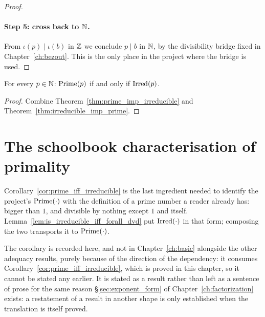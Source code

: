 \begin{proof}
  \paragraph{Step 5: cross back to $\mathbb{N}$.}
  From $\iota(p) \mid \iota(b)$ in $\mathbb{Z}$ we conclude $p \mid b$ in $\mathbb{N}$, by the
  divisibility bridge fixed in Chapter~\ref{ch:bezout}. This is the only place in
  the project where the bridge is used.
\end{proof}

\begin{corollary}
  \leanok
  \label{cor:prime_iff_irreducible}
  For every $p \in \mathbb{N}$: $\mathrm{Prime}(p)$ if and only if $\mathrm{Irred}(p)$.
\end{corollary}
\begin{proof}
  \leanok
  Combine Theorem~\ref{thm:prime_imp_irreducible} and
  Theorem~\ref{thm:irreducible_imp_prime}.
\end{proof}

\section{The schoolbook characterisation of primality}
\label{sec:prime_iff_forall_dvd}

Corollary~\ref{cor:prime_iff_irreducible} is the last ingredient needed to
identify the project's $\mathrm{Prime}(\cdot)$ with the definition of a prime number a
reader already has: bigger than $1$, and divisible by nothing except $1$ and
itself. Lemma~\ref{lem:is_irreducible_iff_forall_dvd} put $\mathrm{Irred}(\cdot)$ in that
form; composing the two transports it to $\mathrm{Prime}(\cdot)$.

The corollary is recorded here, and not in Chapter~\ref{ch:basic} alongside the
other adequacy results, purely because of the direction of the dependency: it
consumes Corollary~\ref{cor:prime_iff_irreducible}, which is proved in this
chapter, so it cannot be stated any earlier. It is stated as a result rather
than left as a sentence of prose for the same reason
\S\ref{sec:exponent_form} of Chapter~\ref{ch:factorization} exists: a
restatement of a result in another shape is only established when the
translation is itself proved.

